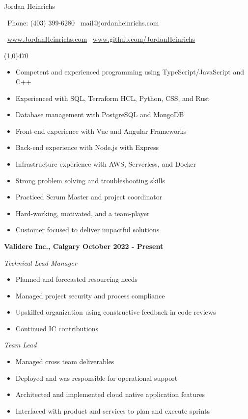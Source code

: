 \documentclass[12pt]{article}
\begin{document}
\centerline{{\Huge \sc Jordan Heinrichs}}
\medskip
\centerline{\textbullet\ Phone: (403) 399-6280 \hspace{5pt} \textbullet\ mail@jordanheinrichs.com}
\centerline{\textbullet\ \url{www.JordanHeinrichs.com}  \hspace{5pt} \textbullet\ \url{www.github.com/JordanHeinrichs}}
\noindent
\line(1,0){470}\\

\bigskip
{}
\medskip

\begin{itemize}
\item Competent and experienced programming using TypeScript/JavaScript and C++
\item Experienced with SQL, Terraform HCL, Python, CSS, and Rust
\item Database management with PostgreSQL and MongoDB
\item Front-end experience with Vue and Angular Frameworks
\item Back-end experience with Node.js with Express
\item Infrastructure experience with AWS, Serverless, and Docker
\item Strong problem solving and troubleshooting skills
\item Practiced Scrum Master and project coordinator
\item Hard-working, motivated, and a team-player
\item Customer focused to deliver impactful solutions
\end{itemize}
\noindent

\bigskip
{}
\bigskip

\noindent \centerline{ \bf Validere Inc., Calgary \hfill October 2022 - Present}
\indent \emph{ Technical Lead Manager }
\begin{itemize}
  \item Planned and forecasted resourcing needs
  \item Managed project security and process compliance
  \item Upskilled organization using constructive feedback in code reviews
  \item Continued IC contributions
\end{itemize}

\indent \emph{ Team Lead }
\begin{itemize}
  \item Managed cross team deliverables
  \item Deployed and was responsible for operational support
  \item Architected and implemented cloud native application features
  \item Interfaced with product and services to plan and execute sprints
\end{itemize}
\end{document}
